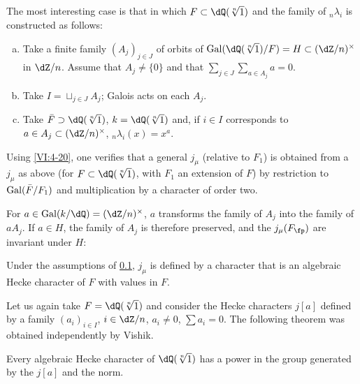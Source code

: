 \subsection{}\label{VI:6-9}

The most interesting case is that in which $F\subset \dQ(\sqrt[n]{1})$ and 
the family of $_n \lambda_i$ is constructed as follows: 
\begin{enumerate}[a)]
  \item Take a finite family $(A_j)_{j\in J}$ of orbits of 
    $\gal(\dQ(\sqrt[n]{1})/F)=H\subset (\dZ/n)^\times$ in $\dZ/n$. Assume that 
    $A_j\ne\{0\}$ and that $\sum_{j\in J} \sum_{a\in A_j} a=0$. 
  \item Take $I=\sqcup_{j\in J} A_j$; Galois acts on each $A_j$. 
  \item Take $\bar F\supset \dQ(\sqrt[n]{1})$, $k=\dQ(\sqrt[n]{1})$ and, if 
    $i\in I$ corresponds to $a\in A_j\subset (\dZ/n)^\times$, 
    $_n\lambda_i(x)=x^a$. 
\end{enumerate}

Using \ref{VI:4-20}, one verifies that a general $j_\mu$ (relative to 
$F_1$) is obtained from a $j_\mu$ as above (for 
$F\subset \dQ(\sqrt[n]{1})$, with $F_1$ an extension of $F$) by restriction to 
$\operatorname{Gal}(\bar F/F_1)$ and multiplication by a character of order two. 

For $a\in \gal(k/\dQ)=(\dZ/n)^\times$, $a$ transforms the family of $A_j$ 
into the family of $a A_j$. If $a\in H$, the family of $A_j$ is therefore preserved, 
and the $j_\mu(F_\fp)$ are invariant under $H$: 





\begin{proposition_}\label{VI:6-10}
Under the assumptions of \ref{VI:6-9}, $j_\mu$ is defined by a character 
that is an algebraic Hecke character of $F$ with values in $F$. 
\end{proposition_}

Let us again take $F=\dQ(\sqrt[n]{1})$ and consider the Hecke characters 
$j[a]$ defined by a family $(a_i)_{i\in I}$, $i\in \dZ/n$, 
$a_i\ne 0$, $\sum a_i=0$. The following theorem was obtained 
independently by Vishik. 





\begin{theorem_}\label{VI:6-11}
Every algebraic Hecke character of $\dQ(\sqrt[n]{1})$ has a power 
in the group generated by the $j[a]$ and the norm. 
\end{theorem_}

